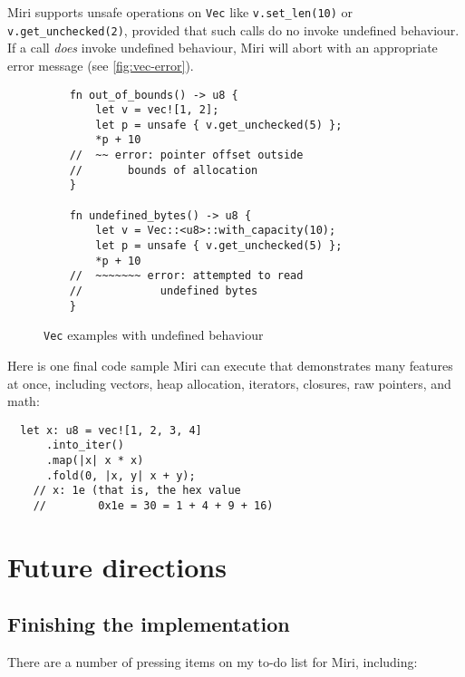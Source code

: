 \documentclass[twocolumn]{article}
\newcommand{\rust}[1]{\texttt{#1}}
\begin{document}
Miri supports unsafe operations on \rust{Vec} like \rust{v.set_len(10)} or
\rust{v.get_unchecked(2)}, provided that such calls do no invoke undefined behaviour. If a call
\emph{does} invoke undefined behaviour, Miri will abort with an appropriate error message (see
\autoref{fig:vec-error}).

\begin{figure}[t]
  \begin{verbatim}
    fn out_of_bounds() -> u8 {
        let v = vec![1, 2];
        let p = unsafe { v.get_unchecked(5) };
        *p + 10
    //  ~~ error: pointer offset outside
    //       bounds of allocation
    }

    fn undefined_bytes() -> u8 {
        let v = Vec::<u8>::with_capacity(10);
        let p = unsafe { v.get_unchecked(5) };
        *p + 10
    //  ~~~~~~~ error: attempted to read
    //            undefined bytes
    }
  \end{verbatim}
  \caption{\rust{Vec} examples with undefined behaviour}
  \label{fig:vec-error}
\end{figure}

\newpage

Here is one final code sample Miri can execute that demonstrates many features at once, including
vectors, heap allocation, iterators, closures, raw pointers, and math:

\begin{verbatim}
  let x: u8 = vec![1, 2, 3, 4]
      .into_iter()
      .map(|x| x * x)
      .fold(0, |x, y| x + y);
    // x: 1e (that is, the hex value
    //        0x1e = 30 = 1 + 4 + 9 + 16)
\end{verbatim}


\section{Future directions}

\subsection{Finishing the implementation}

There are a number of pressing items on my to-do list for Miri, including:
\end{document}
